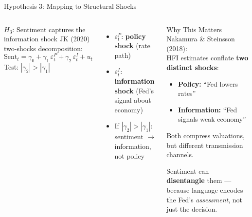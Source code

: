\documentclass[aspectratio=169, 11pt]{beamer}
\begin{document}
\begin{frame}{Hypothesis 3: Mapping to Structural Shocks}
  \begin{columns}[T]
    \begin{ablock}{$H_3$: Sentiment captures the information shock}
      JK (2020) two-shocks decomposition:
      \begin{equation}
        \mathrm{Sent}_t = \gamma_0 + \gamma_1\, \varepsilon_t^{P} + \gamma_2\, \varepsilon_t^{I} + u_t
      \end{equation}
      Test: $|\gamma_2| > |\gamma_1|$
    \end{ablock}

    \begin{itemize}
      \item<2-> $\varepsilon_t^{P}$: \textbf{policy shock} (rate path)
      \item<3-> $\varepsilon_t^{I}$: \textbf{information shock} (Fed's signal about economy)
      \item<4-> If $|\gamma_2| > |\gamma_1|$: sentiment $\to$ information, not policy
    \end{itemize}

    \begin{aalertblock}{Why This Matters}
      \footnotesize
      Nakamura \& Steinsson (2018): \\
      HFI estimates conflate \textbf{two distinct shocks}:
      \begin{itemize}
        \item \textbf{Policy:} ``Fed lowers rates''
        \item \textbf{Information:} ``Fed signals weak economy''
      \end{itemize}
      Both compress valuations, but \alert{different transmission channels}.

      \vspace{0.3em}
      Sentiment can \textbf{disentangle} them — because language encodes the Fed's \emph{assessment}, not just the decision.
    \end{aalertblock}
  \end{columns}
\end{frame}
\end{document}
